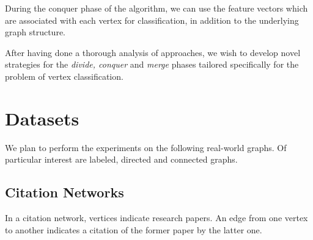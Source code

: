 \documentclass{article}
\begin{document}
During the conquer phase of the algorithm, we can use the feature vectors which are associated with each vertex for classification, in addition to the underlying graph structure.

After having done a thorough analysis of approaches, we wish to develop novel strategies for the {\it divide, conquer} and {\it merge} phases tailored specifically for the problem of vertex classification.  

\section*{Datasets}
We plan to perform the experiments on the following real-world graphs. Of particular interest are labeled, directed and connected graphs.

\subsection*{Citation Networks}
 In a citation network, vertices indicate research papers. An edge from one vertex to another indicates a citation of the former paper by the latter one.
\end{document}
